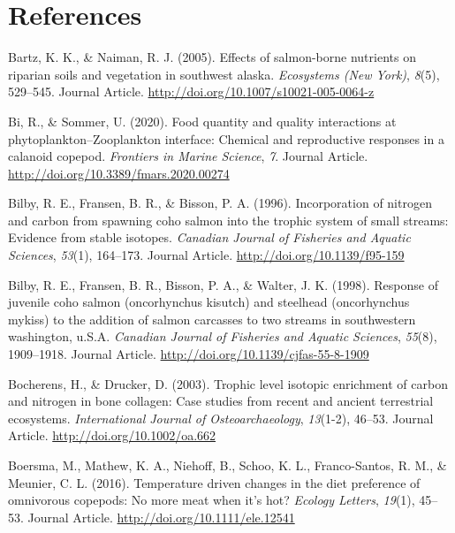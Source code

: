 \documentclass [11pt, proquest] {uwthesis}[2015/03/03]
\begin{document}
\chapter*{References}\label{references}


\noindent

\setlength{\parindent}{-0.20in} \setlength{\leftskip}{0.20in}
\setlength{\parskip}{8pt}

\hypertarget{refs}{}
\hypertarget{ref-Bartz2005}{}
Bartz, K. K., \& Naiman, R. J. (2005). Effects of salmon-borne nutrients
on riparian soils and vegetation in southwest alaska. \emph{Ecosystems
(New York)}, \emph{8}(5), 529--545. Journal Article.
\url{http://doi.org/10.1007/s10021-005-0064-z}

\hypertarget{ref-Bi2020}{}
Bi, R., \& Sommer, U. (2020). Food quantity and quality interactions at
phytoplankton--Zooplankton interface: Chemical and reproductive
responses in a calanoid copepod. \emph{Frontiers in Marine Science},
\emph{7}. Journal Article. \url{http://doi.org/10.3389/fmars.2020.00274}

\hypertarget{ref-Bilby1996}{}
Bilby, R. E., Fransen, B. R., \& Bisson, P. A. (1996). Incorporation of
nitrogen and carbon from spawning coho salmon into the trophic system of
small streams: Evidence from stable isotopes. \emph{Canadian Journal of
Fisheries and Aquatic Sciences}, \emph{53}(1), 164--173. Journal
Article. \url{http://doi.org/10.1139/f95-159}

\hypertarget{ref-Bilby1998}{}
Bilby, R. E., Fransen, B. R., Bisson, P. A., \& Walter, J. K. (1998).
Response of juvenile coho salmon (oncorhynchus kisutch) and steelhead
(oncorhynchus mykiss) to the addition of salmon carcasses to two streams
in southwestern washington, u.S.A. \emph{Canadian Journal of Fisheries
and Aquatic Sciences}, \emph{55}(8), 1909--1918. Journal Article.
\url{http://doi.org/10.1139/cjfas-55-8-1909}

\hypertarget{ref-Bocherens2003}{}
Bocherens, H., \& Drucker, D. (2003). Trophic level isotopic enrichment
of carbon and nitrogen in bone collagen: Case studies from recent and
ancient terrestrial ecosystems. \emph{International Journal of
Osteoarchaeology}, \emph{13}(1-2), 46--53. Journal Article.
\url{http://doi.org/10.1002/oa.662}

\hypertarget{ref-Boersma2015}{}
Boersma, M., Mathew, K. A., Niehoff, B., Schoo, K. L., Franco-Santos, R.
M., \& Meunier, C. L. (2016). Temperature driven changes in the diet
preference of omnivorous copepods: No more meat when it's hot?
\emph{Ecology Letters}, \emph{19}(1), 45--53. Journal Article.
\url{http://doi.org/10.1111/ele.12541}
\end{document}
